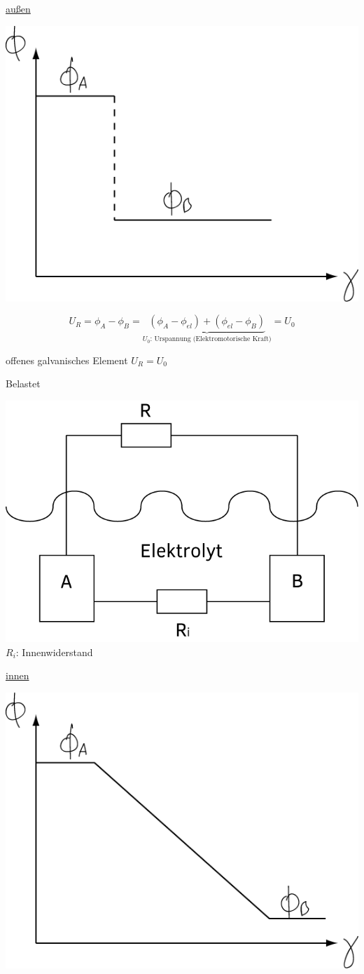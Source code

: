 \underline{außen}

\begin{center}
	\includegraphics[width=0.5\linewidth]{skizzen/15/15_6/15_6B3}
\end{center}

$$ U_R = \phi_A-\phi_B = \underbrace{(\phi_A - \phi_{el}) + (\phi_{el}-\phi_B)}_{U_0\text{: Urspannung (Elektromotorische Kraft)}}  = U_0 $$

offenes galvanisches Element $ U_R = U_0 $

\hfill\break

Belastet

\begin{center}
	\includegraphics[width=0.4\linewidth]{skizzen/15/15_6/15_6B4}\\
	$ R_i $: Innenwiderstand
\end{center}



\underline{innen}

\begin{center}
	\includegraphics[width=0.5\linewidth]{skizzen/15/15_6/15_6B5}
\end{center}


